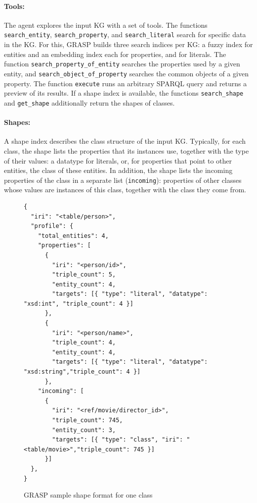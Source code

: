 \paragraph{Tools:}
The agent explores the input KG with a set of tools. The functions \texttt{search\_entity}, \texttt{search\_property}, and \texttt{search\_literal} search for specific data in the KG. For this, GRASP builds three search indices per KG: a fuzzy index for entities and an embedding index each for properties, and for literals. The function \texttt{search\_property\_of\_entity} searches the properties used by a given entity, and \texttt{search\_object\_of\_property} searches the common objects of a given property. The function \texttt{execute} runs an arbitrary SPARQL query and returns a preview of its results. If a shape index is available, the functions \texttt{search\_shape} and \texttt{get\_shape} additionally return the shapes of classes.

\paragraph{Shapes:}
A shape index describes the class structure of the input KG\@. Typically, for each class, the shape lists the properties that its instances use, together with the type of their values: a datatype for literals, or, for properties that point to other entities, the class of these entities. In addition, the shape lists the incoming properties of the class in a separate list (\texttt{incoming}): properties of other classes whose values are instances of this class, together with the class they come from.

\begin{figure}[!htbp]
\begin{lstlisting}[language=Turtle, basicstyle=\ttfamily\scriptsize, columns=fixed, xleftmargin=0pt]
{ 
  "iri": "<table/person>",
  "profile": {
    "total_entities": 4,
    "properties": [
      { 
        "iri": "<person/id>", 
        "triple_count": 5, 
        "entity_count": 4,
        "targets": [{ "type": "literal", "datatype": "xsd:int", "triple_count": 4 }] 
      },
      { 
        "iri": "<person/name>", 
        "triple_count": 4, 
        "entity_count": 4, 
        "targets": [{ "type": "literal", "datatype": "xsd:string","triple_count": 4 }] 
      },
    "incoming": [
      { 
        "iri": "<ref/movie/director_id>", 
        "triple_count": 745, 
        "entity_count": 3,
        "targets": [{ "type": "class", "iri": "<table/movie>","triple_count": 745 }] 
      }] 
  },
}
\end{lstlisting}
\caption{GRASP sample shape format for one class}
\label{fig:grasp-shape}
\end{figure}
\FloatBarrier


